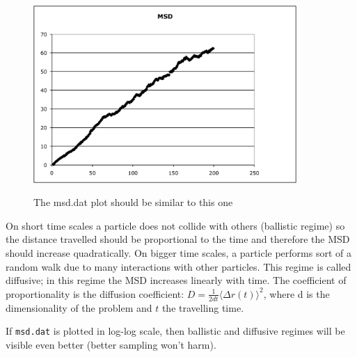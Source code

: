 \documentclass[
paper=a4,                       %
fontsize=11pt,                  %
twoside,                        %
footsepline,                    %
headsepline,                    %
headinclude=false,              %
footinclude=false,              %
pagesize,                       %
]{scrartcl}
\begin{document}
\begin{figure}[ht]
\begin{center}
\includegraphics[width=10cm]{figures/msd}
\label{ }
\caption{The msd.dat plot should be similar to this one}
\end{center}
\end{figure}

\noindent On short time scales a particle does not collide with others
(ballistic regime) so the distance travelled should be proportional to
the time and therefore the MSD should increase quadratically. On
bigger time scales, a particle performs sort of a random walk due to
many interactions with other particles. This regime is called
diffusive; in this regime the MSD increases linearly with time. The coefficient of
proportionality is the diffusion coefficient: $D=\frac{1}{2 d t} \langle
\Delta r(t) \rangle^2$, where d is the dimensionality of the problem and $t$ the
travelling time.

If \texttt{msd.dat} is plotted in log-log scale, then ballistic and diffusive regimes will be visible even better
(better sampling won't harm).



\end{document}
